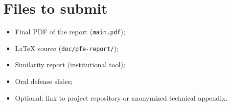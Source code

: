 \section{Files to submit}

\begin{itemize}[leftmargin=*,itemsep=0.2em]
  \item Final PDF of the report (\texttt{main.pdf});
  \item LaTeX source (\texttt{doc/pfe-report/});
  \item Similarity report (institutional tool);
  \item Oral defense slides;
  \item Optional: link to project repository or anonymized technical appendix.
\end{itemize}
